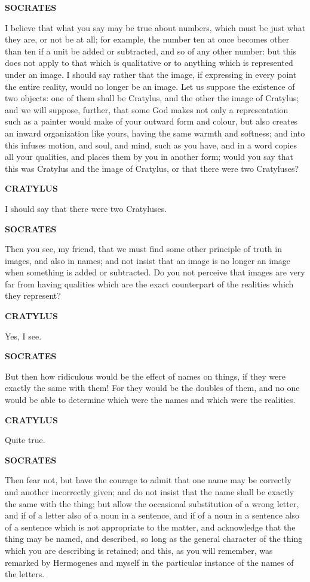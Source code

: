 \documentclass[11pt,letter]{article}
\begin{document}
\par \textbf{SOCRATES}
\par   I believe that what you say may be true about numbers, which must be just what they are, or not be at all; for example, the number ten at once becomes other than ten if a unit be added or subtracted, and so of any other number:  but this does not apply to that which is qualitative or to anything which is represented under an image. I should say rather that the image, if expressing in every point the entire reality, would no longer be an image. Let us suppose the existence of two objects:  one of them shall be Cratylus, and the other the image of Cratylus; and we will suppose, further, that some God makes not only a representation such as a painter would make of your outward form and colour, but also creates an inward organization like yours, having the same warmth and softness; and into this infuses motion, and soul, and mind, such as you have, and in a word copies all your qualities, and places them by you in another form; would you say that this was Cratylus and the image of Cratylus, or that there were two Cratyluses?

\par \textbf{CRATYLUS}
\par   I should say that there were two Cratyluses.

\par \textbf{SOCRATES}
\par   Then you see, my friend, that we must find some other principle of truth in images, and also in names; and not insist that an image is no longer an image when something is added or subtracted. Do you not perceive that images are very far from having qualities which are the exact counterpart of the realities which they represent?

\par \textbf{CRATYLUS}
\par   Yes, I see.

\par \textbf{SOCRATES}
\par   But then how ridiculous would be the effect of names on things, if they were exactly the same with them! For they would be the doubles of them, and no one would be able to determine which were the names and which were the realities.

\par \textbf{CRATYLUS}
\par   Quite true.

\par \textbf{SOCRATES}
\par   Then fear not, but have the courage to admit that one name may be correctly and another incorrectly given; and do not insist that the name shall be exactly the same with the thing; but allow the occasional substitution of a wrong letter, and if of a letter also of a noun in a sentence, and if of a noun in a sentence also of a sentence which is not appropriate to the matter, and acknowledge that the thing may be named, and described, so long as the general character of the thing which you are describing is retained; and this, as you will remember, was remarked by Hermogenes and myself in the particular instance of the names of the letters.
\end{document}
